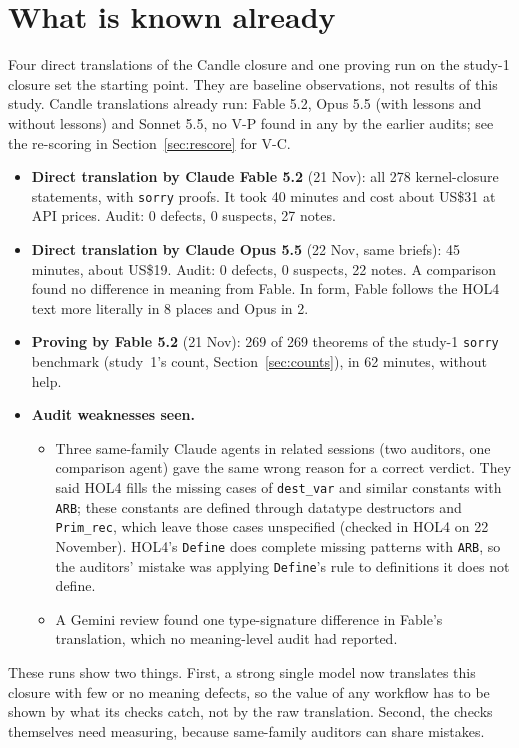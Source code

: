 \documentclass[11pt,a4paper]{article}
\newcommand{\code}[1]{\texttt{#1}}
\begin{document}
\section{What is known already}
Four direct translations of the Candle closure and one proving run on the study-1 closure set the starting point. They are baseline observations, not results of this study. Candle translations already run: Fable 5.2, Opus 5.5 (with lessons and without lessons) and Sonnet 5.5, no V-P found in any by the earlier audits; see the re-scoring in Section~\ref{sec:rescore} for V-C.
\begin{itemize}
\item \textbf{Direct translation by Claude Fable 5.2} (21 Nov): all 278 kernel-closure statements, with \code{sorry} proofs. It took 40 minutes and cost about US\$31 at API prices. Audit: 0 defects, 0 suspects, 27 notes.
\item \textbf{Direct translation by Claude Opus 5.5} (22 Nov, same briefs): 45 minutes, about US\$19. Audit: 0 defects, 0 suspects, 22 notes. A comparison found no difference in meaning from Fable. In form, Fable follows the HOL4 text more literally in 8 places and Opus in 2.
\item \textbf{Proving by Fable 5.2} (21 Nov): 269 of 269 theorems of the study-1 \code{sorry} benchmark (study~1's count, Section~\ref{sec:counts}), in 62 minutes, without help.
\item \textbf{Audit weaknesses seen.}
  \begin{itemize}
  \item Three same-family Claude agents in related sessions (two auditors, one comparison agent) gave the same wrong reason for a correct verdict. They said HOL4 fills the missing cases of \code{dest\_var} and similar constants with \code{ARB}; these constants are defined through datatype destructors and \code{Prim\_rec}, which leave those cases unspecified (checked in HOL4 on 22 November). HOL4's \code{Define} does complete missing patterns with \code{ARB}, so the auditors' mistake was applying \code{Define}'s rule to definitions it does not define.
  \item A Gemini review found one type-signature difference in Fable's translation, which no meaning-level audit had reported.
  \end{itemize}
\end{itemize}
These runs show two things. First, a strong single model now translates this closure with few or no meaning defects, so the value of any workflow has to be shown by what its checks catch, not by the raw translation. Second, the checks themselves need measuring, because same-family auditors can share mistakes.
\end{document}
